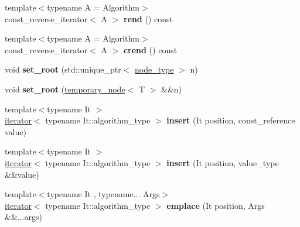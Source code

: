 \begin{DoxyCompactItemize}
\item 
{\footnotesize template$<$typename A  = Algorithm$>$ }\\const\+\_\+reverse\+\_\+iterator$<$ A $>$ {\bfseries rend} () const \hypertarget{classds_1_1tree_a7afb862cd4dce2e3bf928fe13cdda27f}{}\label{classds_1_1tree_a7afb862cd4dce2e3bf928fe13cdda27f}

\item 
{\footnotesize template$<$typename A  = Algorithm$>$ }\\const\+\_\+reverse\+\_\+iterator$<$ A $>$ {\bfseries crend} () const \hypertarget{classds_1_1tree_ab8f060bd7928991f5e01f94275cb8d77}{}\label{classds_1_1tree_ab8f060bd7928991f5e01f94275cb8d77}

\item 
void {\bfseries set\+\_\+root} (std\+::unique\+\_\+ptr$<$ \hyperlink{classds_1_1node}{node\+\_\+type} $>$ n)\hypertarget{classds_1_1tree_a78955e123d7c3bbc6976f79343fadab8}{}\label{classds_1_1tree_a78955e123d7c3bbc6976f79343fadab8}

\item 
void {\bfseries set\+\_\+root} (\hyperlink{classds_1_1temporary__node}{temporary\+\_\+node}$<$ T $>$ \&\&n)\hypertarget{classds_1_1tree_a2d07ade7453b8c7effa2ef1a7784ec41}{}\label{classds_1_1tree_a2d07ade7453b8c7effa2ef1a7784ec41}

\item 
{\footnotesize template$<$typename It $>$ }\\\hyperlink{classds_1_1tree__iterator}{iterator}$<$ typename It\+::algorithm\+\_\+type $>$ {\bfseries insert} (It position, const\+\_\+reference value)\hypertarget{classds_1_1tree_af26485416f1c3a3ab03b9dfd7dce3340}{}\label{classds_1_1tree_af26485416f1c3a3ab03b9dfd7dce3340}

\item 
{\footnotesize template$<$typename It $>$ }\\\hyperlink{classds_1_1tree__iterator}{iterator}$<$ typename It\+::algorithm\+\_\+type $>$ {\bfseries insert} (It position, value\+\_\+type \&\&value)\hypertarget{classds_1_1tree_a1e24dd0a3d12eacd370d731cdf8d4df0}{}\label{classds_1_1tree_a1e24dd0a3d12eacd370d731cdf8d4df0}

\item 
{\footnotesize template$<$typename It , typename... Args$>$ }\\\hyperlink{classds_1_1tree__iterator}{iterator}$<$ typename It\+::algorithm\+\_\+type $>$ {\bfseries emplace} (It position, Args \&\&...args)\hypertarget{classds_1_1tree_ae9fd11ae26be219b2672e468a5e8c9d8}{}\label{classds_1_1tree_ae9fd11ae26be219b2672e468a5e8c9d8}

\end{DoxyCompactItemize}
